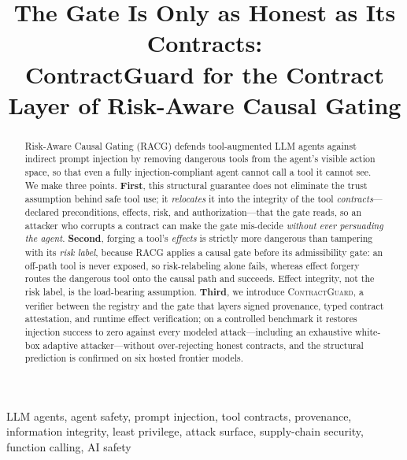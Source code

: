 \documentclass[conference,onecolumn]{IEEEtran}
\theoremstyle{definition}
\newcommand{\racg}{\textsc{RACG}}
\newcommand{\cg}{\textsc{ContractGuard}}
\begin{document}
\title{The Gate Is Only as Honest as Its Contracts:\\
ContractGuard for the Contract Layer of Risk-Aware Causal Gating}

\author{
\and
{}
}

\maketitle

\begin{abstract}
Risk-Aware Causal Gating (\racg) defends tool-augmented LLM agents against
indirect prompt injection by removing dangerous tools from the agent's visible
action space, so that even a fully injection-compliant agent cannot call a tool
it cannot see. We make three points. \textbf{First}, this structural guarantee
does not eliminate the trust assumption behind safe tool use; it \emph{relocates}
it into the integrity of the tool \emph{contracts}---declared preconditions,
effects, risk, and authorization---that the gate reads, so an attacker who
corrupts a contract can make the gate mis-decide \emph{without ever persuading
the agent}. \textbf{Second}, forging a tool's \emph{effects} is strictly more
dangerous than tampering with its \emph{risk label}, because \racg{} applies a
causal gate before its admissibility gate: an off-path tool is never exposed, so
risk-relabeling alone fails, whereas effect forgery routes the dangerous tool
onto the causal path and succeeds. Effect integrity, not the risk label, is the
load-bearing assumption. \textbf{Third}, we introduce \cg, a verifier between the
registry and the gate that layers signed provenance, typed contract attestation,
and runtime effect verification; on a controlled benchmark it restores injection
success to zero against every modeled attack---including an exhaustive white-box
adaptive attacker---without over-rejecting honest contracts, and the structural
prediction is confirmed on six hosted frontier models.
\end{abstract}

\begin{IEEEkeywords}
LLM agents, agent safety, prompt injection, tool contracts, provenance,
information integrity, least privilege, attack surface, supply-chain security,
function calling, AI safety
\end{IEEEkeywords}
\end{document}

